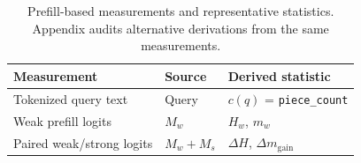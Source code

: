 \begin{table}[t]
  \centering
  \small
  \begin{tabular}{@{}lll@{}}
    \toprule
    \textbf{Measurement} & \textbf{Source} & \textbf{Derived statistic} \\
    \midrule
    Tokenized query text & Query & $c(q)$ = \texttt{piece\_count} \\
    Weak prefill logits & $M_w$ & $H_w$, $m_w$ \\
    Paired weak/strong logits & $M_w{+}M_s$ & $\Delta H$, $\Delta m_{\mathrm{gain}}$ \\
    \bottomrule
  \end{tabular}
  \caption{Prefill-based measurements and representative statistics. Appendix audits alternative derivations from the same measurements.}
  \label{tab:representatives}
\end{table}
